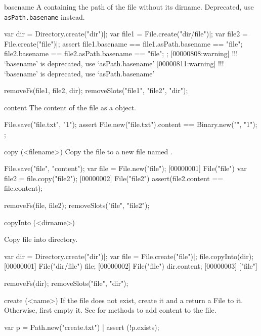 \begin{urbiscriptapi}
\item[basename] A  containing the path of the file without
  its dirname.  Deprecated, use \lstinline|asPath.basename| instead.
\begin{urbiscript}
var dir = Directory.create("dir")|;
var file1 = File.create("dir/file")|;
var file2 = File.create("file")|;
assert
{
  file1.basename == file1.asPath.basename == "file";
  file2.basename == file2.asPath.basename == "file";
};
[00000808:warning] !!! `basename' is deprecated, use `asPath.basename'
[00000811:warning] !!! `basename' is deprecated, use `asPath.basename'
\end{urbiscript}
\begin{urbicomment}
removeFs(file1, file2, dir);
removeSlots("file1", "file2", "dir");
\end{urbicomment}


\item[content]
  The content of the file as a  object.
\begin{urbiscript}
File.save("file.txt", "1\n");
assert
{
  File.new("file.txt").content == Binary.new("", "1\n");
};
\end{urbiscript}


\item[copy](<filename>)
  Copy the file to a new file named .
\begin{urbiscript}
File.save("file", "content");
var file = File.new("file");
[00000001] File("file")
var file2 = file.copy("file2");
[00000002] File("file2")
assert(file2.content == file.content);
\end{urbiscript}
\begin{urbicomment}
removeFs(file, file2);
removeSlots("file", "file2");
\end{urbicomment}


\item[copyInto](<dirname>)
  \experimental{}

  Copy file into  directory.
\begin{urbiscript}
var dir = Directory.create("dir")|;
var file = File.create("file")|;
file.copyInto(dir);
[00000001] File("dir/file")
file;
[00000002] File("file")
dir.content;
[00000003] ["file"]
\end{urbiscript}
\begin{urbicomment}
removeFs(dir);
removeSlots("file", "dir");
\end{urbicomment}


\item[create](<name>)%
  If the file  does not exist, create it and a return a File to
  it.  Otherwise, first empty it.  See  for methods
  to add content to the file.
\begin{urbiscript}
var p = Path.new("create.txt") |
assert (!p.exists);


\end{urbiscript}
\end{urbiscriptapi}
